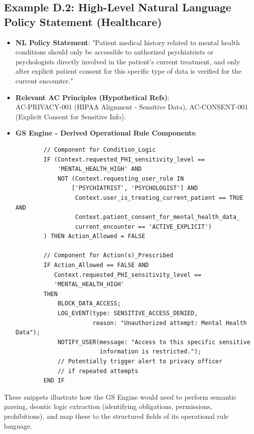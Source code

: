 \documentclass[sigconf,review,anonymous=false]{acmart} %
\begin{document}
\subsection{Example D.2: High-Level Natural Language Policy Statement (Healthcare)}
\begin{itemize}
    \item \textbf{NL Policy Statement}: "Patient medical history related to mental health conditions should only be accessible to authorized psychiatrists or psychologists directly involved in the patient's current treatment, and only after explicit patient consent for this specific type of data is verified for the current encounter."
    \item \textbf{Relevant AC Principles (Hypothetical Refs)}: \\
    AC-PRIVACY-001 (HIPAA Alignment - Sensitive Data), AC-CONSENT-001 (Explicit Consent for Sensitive Info).
    \item \textbf{GS Engine - Derived Operational Rule Components}:
        {\footnotesize
        \begin{verbatim}
        // Component for Condition_Logic
        IF (Context.requested_PHI_sensitivity_level ==
            'MENTAL_HEALTH_HIGH' AND
            NOT (Context.requesting_user_role IN
                ['PSYCHIATRIST', 'PSYCHOLOGIST'] AND
                 Context.user_is_treating_current_patient == TRUE AND
                 Context.patient_consent_for_mental_health_data_
                 current_encounter == 'ACTIVE_EXPLICIT')
        ) THEN Action_Allowed = FALSE

        // Component for Action(s)_Prescribed
        IF Action_Allowed == FALSE AND
           Context.requested_PHI_sensitivity_level ==
           'MENTAL_HEALTH_HIGH'
        THEN
            BLOCK_DATA_ACCESS;
            LOG_EVENT(type: SENSITIVE_ACCESS_DENIED,
                      reason: "Unauthorized attempt: Mental Health Data");
            NOTIFY_USER(message: "Access to this specific sensitive
                        information is restricted.");
            // Potentially trigger alert to privacy officer
            // if repeated attempts
        END IF
        \end{verbatim}
        }
\end{itemize}

These snippets illustrate how the GS Engine would need to perform semantic parsing, deontic logic extraction (identifying obligations, permissions, prohibitions), and map these to the structured fields of its operational rule language.
\end{document}
